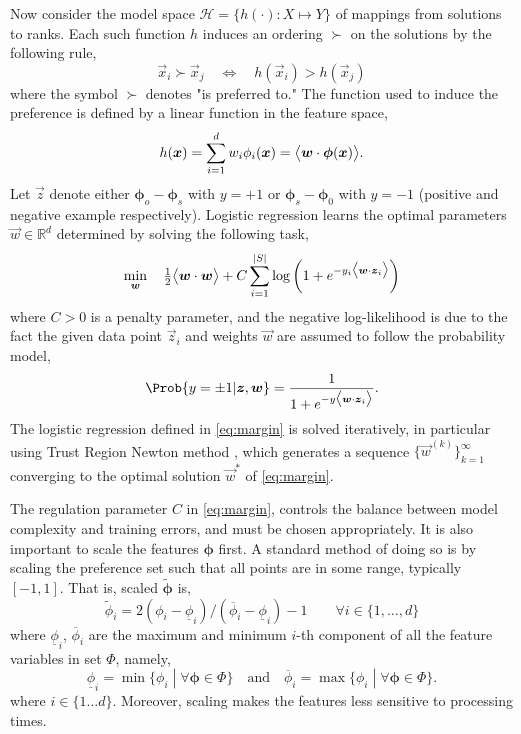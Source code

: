 \documentclass[smallextended]{svjour3}
\renewcommand{\vphi}{\bm \phi}
\begin{document}
Now consider the model space $\mathcal{H} = \{h(\cdot) : X \mapsto Y\}$ of 
mappings from solutions to ranks. Each such function $h$ induces an ordering 
$\succ$ on the solutions  by the following rule,
\begin{equation}\label{eq:linear}
    \vec{x}_i \succ \vec{x}_j \quad \Leftrightarrow \quad h(\vec{x}_i) > 
    h(\vec{x}_j)
\end{equation}
where the symbol $\succ$ denotes "is preferred to."  The function used to 
induce the preference is defined by a linear function in the feature space,
\begin{equation}\label{eq:jssp:linweights}
    h(\vec{x})=\sum_{i=1}^d w_i\phi_i(\vec{x})=\inner{\vec{w}}{\vphi(\vec{x})}.
\end{equation}
Let $\vec{z}$ denote either $\vphi_o-\vphi_s$ with $y=+1$ or $\vphi_s-\vphi_0$ 
with $y=-1$ (positive and negative example respectively). Logistic regression 
learns the optimal parameters $\vec{w}\in\mathbb{R}^d$ determined by solving 
the following task, 
\begin{equation}\label{eq:margin}
    \min_{\vec{w}}\quad \tfrac{1}{2}\inner{\vec{w}}{\vec{w}} + C 
    \sum_{i=1}^{\abs{S}} \log\left(1 + e^{-y_i 
    \inner{\vec{w}}{\vec{z}_i}}\right) 
\end{equation}
where $C > 0$ is a penalty parameter, and the negative log-likelihood is due to 
the fact the given data point $\vec{z}_i$ and weights $\vec{w}$ are assumed to 
follow the probability model,
\begin{equation}\label{eq:prob}
    \Prob{y=\pm1|\vec{z},\vec{w}}=\frac{1}{1+e^{-y\inner{\vec{w}}{\vec{z}_i}}}.
\end{equation}
The logistic regression defined in \cref{eq:margin} is solved iteratively, in 
particular using Trust Region Newton method \cite{Lin08:newtontrustregion}, 
which generates a sequence $\{\vec{w}^{(k)}\}_{k=1}^\infty$ converging to the 
optimal solution $\vec{w}^*$ of \cref{eq:margin}.

The regulation parameter $C$ in \cref{eq:margin}, controls the balance between 
model complexity and training errors, and must be chosen appropriately. 
It is also important to scale the features $\vphi$ first. A standard method of 
doing so is by scaling the preference set such that all points are in some 
range, typically $[-1,1]$. That is, scaled $\tilde{\vphi}$ is,
\begin{equation}\label{eq:scale}
    \tilde{\phi}_i = 2 (\phi_i - \underline{\phi}_i) / (\overline{\phi}_i - 
    \underline{\phi}_i) - 1 
    \quad\quad \forall i\in\{1,\ldots,d\}
\end{equation}
where $\underline{\phi}_i$, $\overline{\phi}_i$ are the maximum and minimum 
$i$-th component of all the feature variables in set $\Phi$, namely,
\begin{equation}
    \underline{\phi}_i=\min\{\phi_i\;|\;\forall\vphi\in \Phi\} 
    \quad\textrm{and}\quad \overline{\phi}_i=\max\{\phi_i\;|\;\forall\vphi\in 
    \Phi\}.
\end{equation}
where $i\in\{1\ldots d\}$. Moreover, scaling makes the features less sensitive 
to processing times. 
\end{document}
